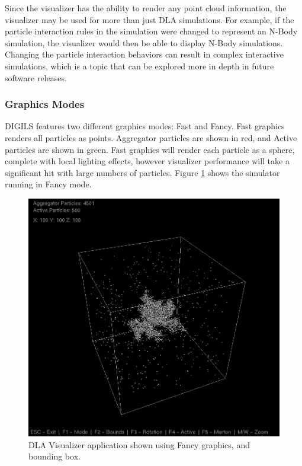 \documentclass[fleqn,10pt]{UserGuideArx} %
\begin{document}
Since the visualizer has the ability to render any point cloud information, the visualizer may be used for more than just DLA simulations. For example, if the particle interaction rules in the simulation were changed to represent an N-Body simulation, the visualizer would then be able to display N-Body simulations.\\

Changing the particle interaction behaviors can result in complex interactive simulations, which is a topic that can be explored more in depth in future software releases.\\

\subsubsection{Graphics Modes}
DIGILS features two different graphics modes: Fast and Fancy. Fast graphics renders all particles as points. Aggregator particles are shown in red, and Active particles are shown in green. Fast graphics will render each particle as a sphere, complete with local lighting effects, however visualizer performance will take a significant hit with large numbers of particles. Figure \ref{fig:Fancy} shows the simulator running in Fancy mode.

\begin{figure}[!h]\centering %
    \includegraphics[width=\linewidth]{images/Fancy.png}
    \caption{DLA Visualizer application shown using Fancy graphics, and bounding box.}
    \label{fig:Fancy}
    \end{figure}
\end{document}
